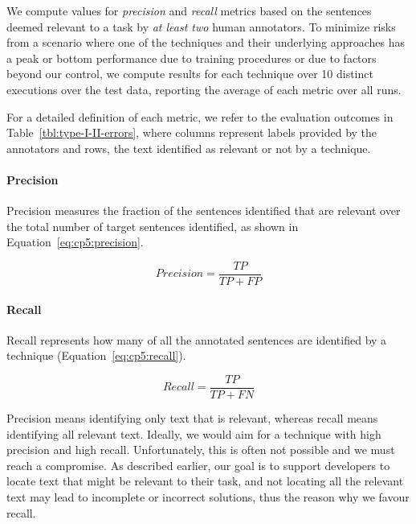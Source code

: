 We compute values for \textit{precision} and \textit{recall} metrics based on the sentences 
deemed relevant to a task by \textit{at least two} human annotators.
To minimize risks from a scenario where one of the techniques and their underlying approaches has a peak or
bottom performance due to training procedures or due to factors beyond our control, 
we compute results for each technique over 10 distinct executions over the test data, 
reporting the average of each metric over all runs.


For a detailed definition of each metric, we refer to the evaluation outcomes in Table~\ref{tbl:type-I-II-errors}, where  columns represent  labels provided by the annotators and rows,
the text identified as relevant or not by a technique.

% 

\medskip




\paragraph{\textbf{Precision}}

Precision measures the fraction of the sentences identified that are relevant over the total number of target sentences identified, as shown in Equation~\ref{eq:cp5:precision}.



\begin{equation}
\label{eq:cp5:precision}    
    Precision = \frac{TP}{TP + FP}
\end{equation}



\paragraph{\textbf{Recall}} Recall represents how many of all the annotated sentences are identified by a technique (Equation~\ref{eq:cp5:recall}).


\begin{equation}
\label{eq:cp5:recall}        
    Recall = \frac{TP}{TP + FN}
\end{equation}



\medskip
Precision means identifying only text that is relevant, whereas recall means identifying all relevant text.
Ideally, we would aim for a technique with high precision and high recall. Unfortunately, this is often not possible and we must reach a compromise.
As described earlier, our goal is to support developers to locate text that might be relevant to their task, 
and not locating all the relevant text may lead to incomplete or incorrect solutions, thus the reason why we favour recall.






